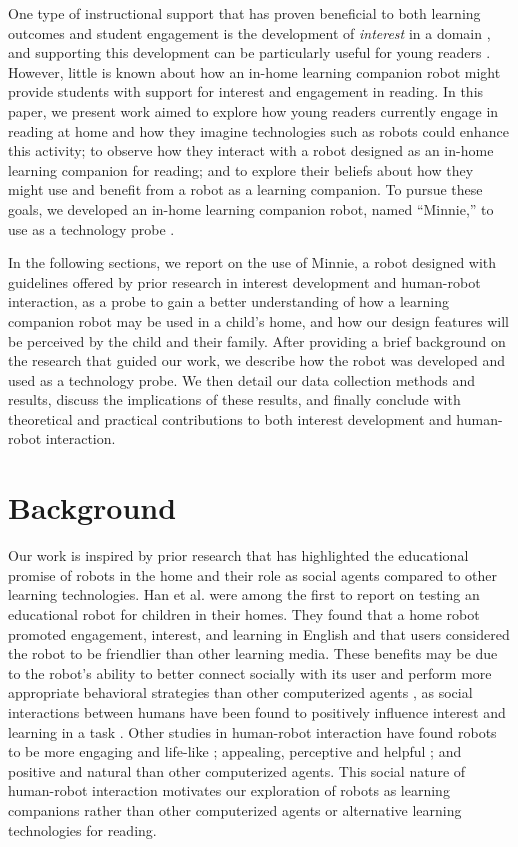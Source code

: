 \documentclass{sigchi}
\begin{document}
One type of instructional support that has proven beneficial to both learning outcomes and student engagement is the development of \textit{interest} in a domain \cite{Hidi:2006}, and supporting this development can be particularly useful for young readers \cite{Jones:2011}. However, little is known about how an in-home learning companion robot might provide students with support for interest and engagement in reading. In this paper, we present work aimed to explore how young readers currently engage in reading at home and how they imagine technologies such as robots could enhance this activity; to observe how they interact with a robot designed as an in-home learning companion for reading; and to explore their beliefs about how they might use and benefit from a robot as a learning companion. To pursue these goals, we developed an in-home learning companion robot, named ``Minnie,'' to use as a technology probe \cite{Hutchinson:2003}.

In the following sections, we report on the use of Minnie, a robot designed with guidelines offered by prior research in interest development and human-robot interaction, as a probe to gain a better understanding of how a learning companion robot may be used in a child's home, and how our design features will be perceived by the child and their family. After providing a brief background on the research that guided our work, we describe how the robot was developed and used as a technology probe. We then detail our data collection methods and results, discuss the implications of these results, and finally conclude with theoretical and practical contributions to both interest development and human-robot interaction.

\section{Background}
Our work is inspired by prior research that has highlighted the educational promise of robots in the home and their role as social agents compared to other learning technologies. Han et al. \cite{Han:2005} were among the first to report on testing an educational robot for children in their homes. They found that a home robot promoted engagement, interest, and learning in English and that users considered the robot to be friendlier than other learning media. These benefits may be due to the robot's ability to better connect socially with its user and perform more appropriate behavioral strategies than other computerized agents \cite{Brown:2013}, as social interactions between humans have been found to positively influence interest and learning in a task \cite{Sansone:2005}. Other studies in human-robot interaction have found robots to be more engaging and life-like \cite{Kiesler:2008}; appealing, perceptive and helpful \cite{Wainer:2007}; and positive and natural \cite{Bainbridge:2011} than other computerized agents. This social nature of human-robot interaction motivates our exploration of robots as learning companions rather than other computerized agents or alternative learning technologies for reading.
\end{document}
